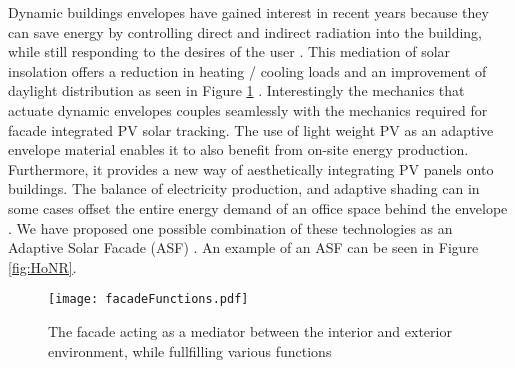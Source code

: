 Dynamic buildings envelopes have gained interest in recent years because they can save energy by controlling direct and indirect radiation into the building, while still responding to the desires of the user \cite{loonen2013climate}. This mediation of solar insolation offers a reduction in heating / cooling loads and an improvement of daylight distribution as seen in Figure \ref{fig:ASFschematic} \cite{rossi2012adaptive}. Interestingly the mechanics that actuate dynamic envelopes couples seamlessly with the mechanics required for facade integrated PV solar tracking. The use of light weight PV as an adaptive envelope material enables it to also benefit from on-site energy production. Furthermore, it provides a new way of aesthetically integrating PV panels onto buildings. The balance of electricity production, and adaptive shading can in some cases offset the entire energy demand of an office space behind the envelope \cite{jayathissa2015abs}. We have proposed one possible combination of these technologies as an Adaptive Solar Facade (ASF) \cite{nagy2015frontiers}. An example of an ASF can be seen in Figure \ref{fig:HoNR}.







\begin{figure}
\begin{center}
\texttt{[image: facadeFunctions.pdf]}
\caption{The facade acting as a mediator between the interior and exterior environment, while fullfilling various functions \cite{nagy2015frontiers}}
\label{fig:ASFschematic}
\end{center}
\end{figure}

